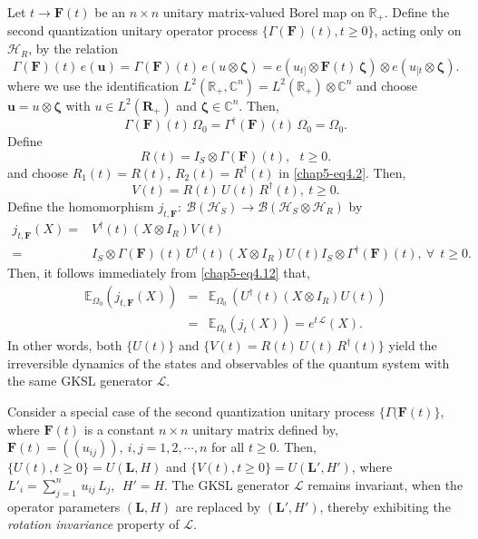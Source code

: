 Let $t\rightarrow \mathbf{F}(t)$ be an $n\times n$  unitary matrix-valued Borel map on $\mathbb{R}_+$. Define the second quantization unitary operator process $\{\Gamma(\mathbf{F})(t), t\geq 0\}$, acting only on $\mathcal{H}_R$, by the relation 
\begin{equation} 
\Gamma(\mathbf{F})(t)\, e(\mathbf{u})=\Gamma(\mathbf{F})(t)\,e(u\otimes \pmb{\zeta})= 
e\left(u_{t]}\otimes \mathbf{F}(t)\, \pmb{\zeta}\right)\otimes e(u_{[t}\otimes \pmb{\zeta}).  \label{chap5-eq4.11}
\end{equation}
where we  use the identification $L^2(\mathbb{R}_+,\mathbb{C}^n)=L^2(\mathbb{R}_+)\otimes\mathbb{C}^n$ and choose 
$\mathbf{u}=u\otimes \pmb{\zeta}$ with $u \in  L^2(\mathbf{R}_+)$ and  $\pmb{\zeta}\in\mathbb{C}^n$. Then, 
\begin{equation} 
\Gamma(\mathbf{F})(t)\, \Omega_0= \Gamma^\dag(\mathbf{F})(t)\, \Omega_0=\Omega_0.   \label{chap5-eq4.12}
\end{equation}
Define 
\begin{equation}
R(t)=I_S\otimes \Gamma(\mathbf{F})(t),\ \ \  t\geq 0. \label{chap5-eq4.13}
\end{equation}
and choose $R_1(t)=R(t)$, $R_2(t)=R^\dag(t)$ in \eqref{chap5-eq4.2}. Then, 
$$
V(t)=R(t)\,U(t)\, R^\dag(t),\  t\geq 0.
$$  
Define the homomorphism $j_{t,\mathbf{F}}:  \ \mathcal{B}(\mathcal{H}_S)\longrightarrow \mathcal{B}(\mathcal{H}_S\otimes\mathcal{H}_R)$ by 
\begin{align}
j_{t,\mathbf{F}} (X) =& V^{\dagger}(t) (X \otimes I_R)  V(t) \nonumber \\
=& I_S\otimes \Gamma(\mathbf{F})(t)\,   U^{\dagger}(t) (X \otimes I_R)  U(t) I_S\otimes \Gamma^\dag(\mathbf{F})(t),\ \forall \ \  t\geq 0. \label{chap5-eq4.14}
\end{align}  
Then, it follows immediately from  \eqref{chap5-eq4.12} that, 
\begin{eqnarray}
\mathbb{E}_{\Omega_0} \left(j_{t,\mathbf{F}}(X)\right)&=&\mathbb{E}_{\Omega_0}\, \left(U^{\dagger}(t) (X \otimes I_R)  U(t)\right)\nonumber \\ 
&=& \mathbb{E}_{\Omega_0} \left(j_t(X)\right)=e^{t\,\mathcal{L}}(X).\label{chap5-eq4.15}
\end{eqnarray}
In other words, both   $\{U(t)\}$ and $\{V(t)=R(t)\,U(t)\, R^\dag(t)\}$ yield the irreversible dynamics of the states and observables of the quantum system with the same GKSL generator $\mathcal{L}$.      

\begin{remark}
Consider a special case of the second quantization unitary process $\{\Gamma(\mathbf{F}(t)\}$, where $\mathbf{F}(t)$ is a constant $n\times n$ unitary matrix defined by, $\mathbf{F}(t)=((u_{ij})),\ i,j=1,2,\cdots , n$ for all $t\geq 0$. Then, $\{U(t), t\geq 0\}=U(\mathbf{L},H)$ and $\{V(t), t\geq 0\}=U(\mathbf{L}',H')$, where $L'_i=\sum_{j=1}^n\, u_{ij}\, L_j, \ \ H'=H$.  The GKSL generator $\mathcal{L}$ remains invariant, when  the operator parameters $(\mathbf{L}, H)$ are replaced by $(\mathbf{L'}, H')$, thereby exhibiting the  {\em rotation invariance} property of $\mathcal{L}$. 
\end{remark}


